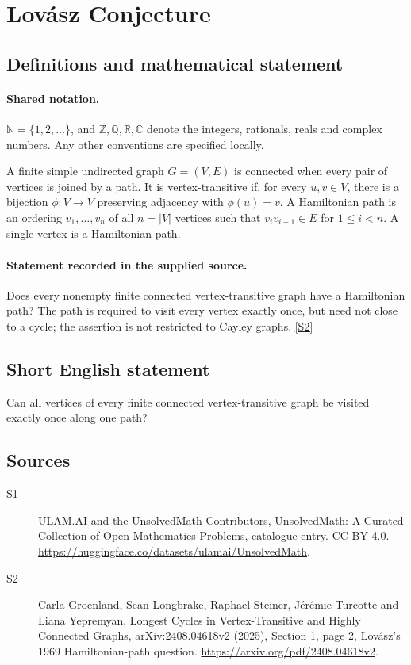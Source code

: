 \documentclass[11pt]{article}
\newcommand{\sref}[2]{\hyperlink{source:#1:#2}{[S#2]}}
\begin{document}
\section{Lovász Conjecture}\label{statement}

\subsection{Definitions and mathematical statement}

\paragraph{Shared notation.}$\mathbb N=\{1,2,\ldots\}$, and $\mathbb Z,\mathbb Q,\mathbb R,\mathbb C$ denote the integers, rationals, reals and complex numbers. Any other conventions are specified locally.


A finite simple undirected graph $G=(V,E)$ is connected when every pair of vertices is joined by a path. It is vertex-transitive if, for every $u,v\in V$, there is a bijection $\phi:V\to V$ preserving adjacency with $\phi(u)=v$. A Hamiltonian path is an ordering $v_1,\ldots,v_n$ of all $n=|V|$ vertices such that $v_iv_{i+1}\in E$ for $1\le i<n$. A single vertex is a Hamiltonian path.
\paragraph{Statement recorded in the supplied source.}
Does every nonempty finite connected vertex-transitive graph have a Hamiltonian path? The path is required to visit every vertex exactly once, but need not close to a cycle; the assertion is not restricted to Cayley graphs. \sref{statement}{2}
\subsection{Short English statement}
Can all vertices of every finite connected vertex-transitive graph be visited exactly once along one path?
\subsection{Sources}
\begin{description}
\item[\hypertarget{source:statement:1}{S1}] ULAM.AI and the UnsolvedMath Contributors, UnsolvedMath: A Curated Collection of Open Mathematics Problems, catalogue entry. CC BY 4.0. \url{https://huggingface.co/datasets/ulamai/UnsolvedMath}.
\item[\hypertarget{source:statement:2}{S2}] Carla Groenland, Sean Longbrake, Raphael Steiner, Jérémie Turcotte and Liana Yepremyan, Longest Cycles in Vertex-Transitive and Highly Connected Graphs, arXiv:2408.04618v2 (2025), Section 1, page 2, Lovász’s 1969 Hamiltonian-path question. \url{https://arxiv.org/pdf/2408.04618v2}.
\end{description}
\label{end:statement}
\end{document}
